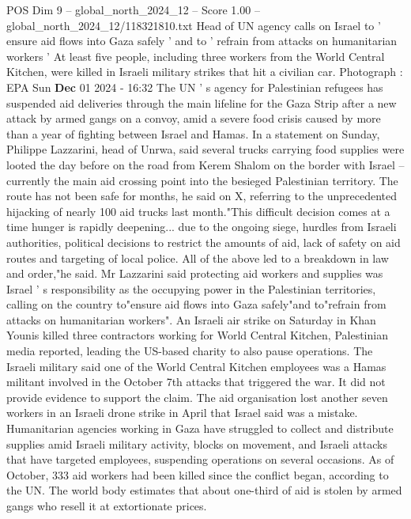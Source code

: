 \begin{textsample}{POS Dim 9 – global\_north\_2024\_12 – Score 1.00 – global\_north\_2024\_12/118321810.txt}  \label{ex:f9_pos_337}
Head of UN agency calls on Israel to ' ensure aid flows into Gaza safely ' and to ' refrain from attacks on humanitarian workers ' At least five people, including three workers from the World Central Kitchen, were killed in Israeli military strikes that hit a civilian car.
Photograph : EPA Sun \textbf{Dec} 01 2024 - 16:32 The UN ' s agency for Palestinian refugees has suspended aid deliveries through the main lifeline for the Gaza Strip after a new attack by armed gangs on a convoy, amid a severe food crisis caused by more than a year of fighting between Israel and Hamas.
In a statement on Sunday, Philippe Lazzarini, head of Unrwa, said several trucks carrying food supplies were looted the day before on the road from Kerem Shalom on the border with Israel -- currently the main aid crossing point into the besieged Palestinian territory.
The route has not been safe for months, he said on X, referring to the unprecedented hijacking of nearly 100 aid trucks last month."This difficult decision comes at a time hunger is rapidly deepening... due to the ongoing siege, hurdles from Israeli authorities, political decisions to restrict the amounts of aid, lack of safety on aid routes and targeting of local police.
All of the above led to a breakdown in law and order,"he said.
Mr Lazzarini said protecting aid workers and supplies was Israel ' s responsibility as the occupying power in the Palestinian territories, calling on the country to"ensure aid flows into Gaza safely"and to"refrain from attacks on humanitarian workers".
An Israeli air strike on Saturday in Khan Younis killed three contractors working for World Central Kitchen, Palestinian media reported, leading the US-based charity to also pause operations.
The Israeli military said one of the World Central Kitchen employees was a Hamas militant involved in the October 7th attacks that triggered the war.
It did not provide evidence to support the claim.
The aid organisation lost another seven workers in an Israeli drone strike in April that Israel said was a mistake.
Humanitarian agencies working in Gaza have struggled to collect and distribute supplies amid Israeli military activity, blocks on movement, and Israeli attacks that have targeted employees, suspending operations on several occasions.
As of October, 333 aid workers had been killed since the conflict began, according to the UN.
The world body estimates that about one-third of aid is stolen by armed gangs who resell it at extortionate prices.

\end{textsample}
